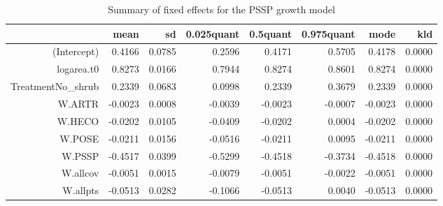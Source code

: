 \begin{table}[ht]
\centering
\caption{Summary of fixed effects for the PSSP growth model} 
\label{PSSPgrowth}
\begin{tabular}{rrrrrrrr}
  \hline
 & mean & sd & 0.025quant & 0.5quant & 0.975quant & mode & kld \\ 
  \hline
(Intercept) & 0.4166 & 0.0785 & 0.2596 & 0.4171 & 0.5705 & 0.4178 & 0.0000 \\ 
  logarea.t0 & 0.8273 & 0.0166 & 0.7944 & 0.8274 & 0.8601 & 0.8274 & 0.0000 \\ 
  TreatmentNo\_shrub & 0.2339 & 0.0683 & 0.0998 & 0.2339 & 0.3679 & 0.2339 & 0.0000 \\ 
  W.ARTR & -0.0023 & 0.0008 & -0.0039 & -0.0023 & -0.0007 & -0.0023 & 0.0000 \\ 
  W.HECO & -0.0202 & 0.0105 & -0.0409 & -0.0202 & 0.0004 & -0.0202 & 0.0000 \\ 
  W.POSE & -0.0211 & 0.0156 & -0.0516 & -0.0211 & 0.0095 & -0.0211 & 0.0000 \\ 
  W.PSSP & -0.4517 & 0.0399 & -0.5299 & -0.4518 & -0.3734 & -0.4518 & 0.0000 \\ 
  W.allcov & -0.0051 & 0.0015 & -0.0079 & -0.0051 & -0.0022 & -0.0051 & 0.0000 \\ 
  W.allpts & -0.0513 & 0.0282 & -0.1066 & -0.0513 & 0.0040 & -0.0513 & 0.0000 \\ 
   \hline
\end{tabular}
\end{table}

